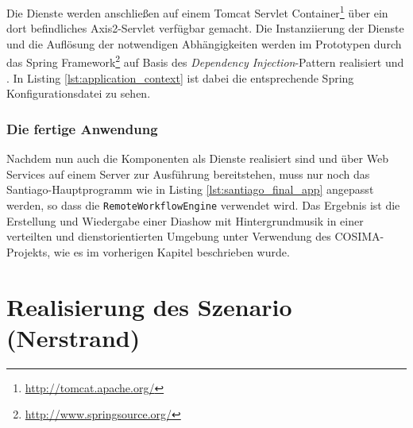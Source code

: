   

  Die Dienste werden anschließen auf einem Tomcat Servlet Container\footnote{\url{http://tomcat.apache.org/}} über ein dort befindliches Axis2-Servlet verfügbar gemacht. Die Instanziierung der Dienste und die Auflösung der notwendigen Abhängigkeiten werden im Prototypen durch das Spring Framework\footnote{\url{http://www.springsource.org/}} auf Basis des \emph{Dependency Injection}-Pattern realisiert \citep[S. 130]{johnson2004eoo} und \citep{fowler04di}. In Listing \ref{lst:application_context} ist dabei die entsprechende Spring Konfigurationsdatei zu sehen.

  
  

\subsubsection{Die fertige Anwendung} %
\label{ssub:die_fertige_anwendung}

  Nachdem nun auch die Komponenten als Dienste realisiert sind und über Web Services auf einem Server zur Ausführung bereitstehen, muss nur noch das Santiago-Hauptprogramm wie in Listing \ref{lst:santiago_final_app} angepasst werden, so dass die \verb!RemoteWorkflowEngine! verwendet wird. Das Ergebnis ist die Erstellung und Wiedergabe einer Diashow mit Hintergrundmusik in einer verteilten und dienstorientierten Umgebung unter Verwendung des COSIMA-Projekts, wie es im vorherigen Kapitel beschrieben wurde.

  
  

  

\section{Realisierung des Szenario (Nerstrand)} %
\label{sec:realisierung_des_szenario}

